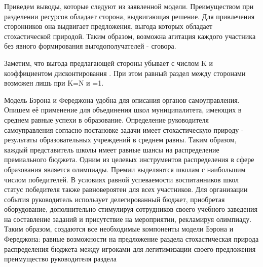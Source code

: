 Приведем выводы, которые следуют из заявленной модели. Преимуществом при разделении ресурсов обладает сторона, выдвигающая решение. Для привлечения сторонников она выдвигает предложения, выгода которых обладает стохастической природой. Таким образом, возможна агитация каждого участника без явного формирования выгодополучателей - сговора. 

Заметим, что выгода предлагающей стороны убывает с числом K и коэффициентом дисконтирования . При этом равный раздел между сторонами возможен лишь при K=N и =1. 

Модель Бэрона и Фереджона удобна для описания органов самоуправления. Опишем её  применение для объединения школ муниципалитета, имеющих в среднем равные успехи в образование. Определение руководителя самоуправления согласно постановке задачи имеет стохастическую природу - результаты образовательных учреждений в среднем равны. Таким образом, каждый представитель школы имеет равные шансы на распределение премиального бюджета. Одним из целевых инструментов распределения в сфере образования является олимпиады. Премии выделяются школам с наибольшим числом победителей. В условиях равной успеваемости воспитанников школ статус победителя также равновероятен для всех участников. Для организации события руководитель использует делегированный бюджет, приобретая оборудование, дополнительно стимулируя сотрудников своего учебного заведения на составление заданий и присутствие на мероприятии, рекламируя олимпиаду. Таким образом, создаются все необходимые компоненты модели Бэрона и Фереджона:
равные возможности на предложение раздела
стохастическая природа распределения бюджета между игроками для легитимизации своего предложения
преимущество руководителя раздела